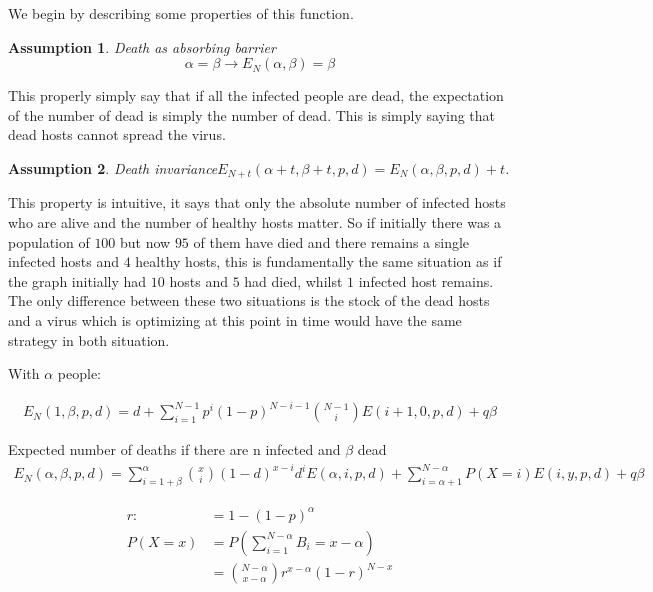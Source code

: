 \documentclass[12pt]{report}
\newtheorem{assumption}{Assumption}
\numberwithin{equation}{section}
\begin{document}
We begin by describing some properties of this function. 

\begin{assumption}{Death as absorbing barrier}\label{ass1}
\begin{equation}
\alpha = \beta \rightarrow E_N(\alpha,\beta)= \beta
\end{equation}
\end{assumption}

This properly simply say that if all the infected people are dead, the expectation of the number of dead is simply the number of dead. This is simply saying that dead hosts cannot spread the virus. 


\begin{assumption}{Death invariance}\label{ass2}
$E_{N+t}(\alpha +t,\beta +t, p, d)=E_{N}(\alpha , \beta ,p, d) + t$.
\end{assumption}

This property is intuitive, it says that only the absolute number of infected hosts who are alive and the number of healthy hosts matter. So if initially there was a population of $100$ but now $95$ of them have died and there remains a single infected hosts and $4$ healthy hosts, this is fundamentally the same situation as if the graph initially had $10$ hosts and $5$ had died, whilst $1$ infected host remains. The only difference between these two situations is the stock of the dead hosts and a virus which is optimizing at this point in time would have the same strategy in both situation. 
 

With $\alpha$ people: 

\begin{align*}
E_N(1,\beta,p,d) = d + \sum_{i=1}^{N-1}p^i(1-p)^{N-i-1}\binom{N-1}{i}E(i+1,0,p,d ) + q \beta
\end{align*}

Expected number of deaths if there are n infected and $\beta$ dead
\begin{align*}
E_N(\alpha,\beta,p,d ) = \sum_{i = 1+ \beta}^{\alpha} \binom{x}{i}(1-d)^{x-i}d^i E( \alpha , i,p,d ) + \sum_{i=\alpha+1}^{N-\alpha} P(X=i)E(i,y,p,d ) + q \beta
\end{align*}

\begin{align*}
r: &=1-(1-p)^{\alpha} \\
P(X=x)&=P\left(\sum_{i=1}^{N-\alpha}B_i=x-\alpha \right) \\
&=\binom{N- \alpha}{x-\alpha}r^{x-\alpha}(1-r)^{N-x}
\end{align*}
\end{document}
